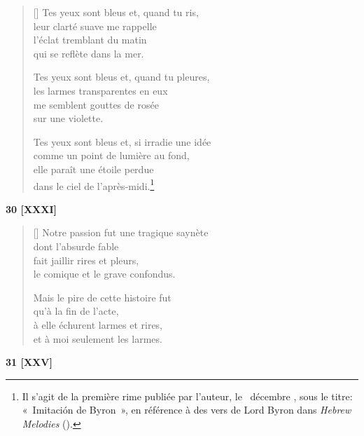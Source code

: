 \documentclass[a4paper,12pt]{book}
\begin{document}
\begin{verse}[\versewidth]
  Tes yeux sont bleus et, quand tu ris, \\
  leur clarté suave me rappelle \\
  l'éclat tremblant du matin \\
  qui se reflète dans la mer.

  Tes yeux sont bleus et, quand tu pleures, \\
  les larmes transparentes en eux \\
  me semblent gouttes de rosée \\
  sur une violette.

  Tes yeux sont bleus et, si irradie une idée \\
  comme un point de lumière au fond, \\
  elle paraît une étoile perdue \\
  dans le ciel de l'après-midi.\footnote{Il s'agit de la première rime
  publiée par l'auteur, le ~décembre
  , sous le titre: «~Imitación de Byron~», en
  référence à des vers de Lord Byron dans \emph{Hebrew Melodies}
  ().}
\end{verse}

\bigskip

\begin{center}
  \textbf{30 [XXXI]}
\end{center}

\settowidth{\versewidth}{Notre passion fut une tragique saynète}

\begin{verse}[\versewidth]
  Notre passion fut une tragique saynète \\
  dont l'absurde fable \\
  fait jaillir rires et pleurs, \\
  le comique et le grave confondus.

  Mais le pire de cette histoire fut \\
  qu'à la fin de l'acte, \\
  à elle échurent larmes et rires, \\
  et à moi seulement les larmes.
\end{verse}

\bigskip

\begin{center}
  \textbf{31 [XXV]}
\end{center}
\end{document}
